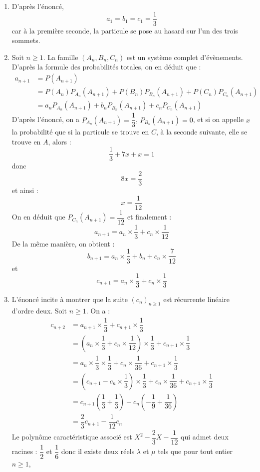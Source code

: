 \documentclass[a4paper,10pt]{report}
\begin{document}
\corr 

\begin{enumerate}
\item D'après l'énoncé,
$$ a_1= b_1=c_1 = \dfrac{1}{3}$$
car à la première seconde, la particule se pose au hasard sur l'un des trois sommets.
\item Soit $n \geq 1$. La famille $(A_n,B_n,C_n)$ est un système complet d'évènements. D'après la formule des probabilités totales, on en déduit que :
\begin{align*}
a_{n+1} & = P(A_{n+1}) \\
& = P(A_n) P_{A_n}(A_{n+1}) + P(B_n) P_{B_n}(A_{n+1}) + P(C_n) P_{C_n}(A_{n+1})  \\
& = a_n P_{A_n}(A_{n+1}) + b_n P_{B_n}(A_{n+1}) + c_n P_{C_n}(A_{n+1})  
\end{align*}
D'après l'énoncé, on a $P_{A_n}(A_{n+1})= \dfrac{1}{3}$, $P_{B_n}(A_{n+1}) = 0$, et si on appelle $x$ la probabilité que si la particule se trouve en $C$, à la seconde suivante, elle se trouve en $A$, alors :
$$ \dfrac{1}{3} + 7x + x = 1$$
donc 
$$ 8x = \dfrac{2}{3}$$
et ainsi :
$$ x = \dfrac{1}{12}$$
On en déduit que $P_{C_n}(A_{n+1}) = \dfrac{1}{12}$ et finalement :
$$ a_{n+1} = a_n \times \dfrac{1}{3}  + c_n \times \dfrac{1}{12}$$
De la même manière, on obtient :
$$ b_{n+1} = a_n \times \dfrac{1}{3} + b_n + c_n \times \dfrac{7}{12} $$
et 
$$ c_{n+1} = a_n \times \dfrac{1}{3} + c_n \times \dfrac{1}{3}$$
\item L'énoncé incite à montrer que la suite $(c_n)_{n \geq 1}$ est récurrente linéaire d'ordre deux. Soit $n \geq 1$. On a :
\begin{align*}
c_{n+2} & = a_{n+1} \times \dfrac{1}{3} + c_{n+1} \times \dfrac{1}{3} \\
& = \left(  a_n \times \dfrac{1}{3}  + c_n \times \dfrac{1}{12} \right) \times \dfrac{1}{3} + c_{n+1} \times \dfrac{1}{3} \\
& = a_n \times \dfrac{1}{3} \times \dfrac{1}{3}  + c_n \times \dfrac{1}{36}  + c_{n+1} \times \dfrac{1}{3} \\
& = \left( c_{n+1} - c_n \times \dfrac{1}{3} \right) \times \dfrac{1}{3}  + c_n \times \dfrac{1}{36}  + c_{n+1} \times \dfrac{1}{3} \\ 
& = c_{n+1} \left( \dfrac{1}{3} + \dfrac{1}{3} \right) + c_n \left(-\dfrac{1}{9} + \dfrac{1}{36} \right) \\
& = \dfrac{2}{3} c_{n+1} - \dfrac{1}{12} c_n
\end{align*}
Le polynôme caractéristique associé est $X^2 - \dfrac{2}{3} X - \dfrac{1}{12}$ qui admet deux racines : $\dfrac{1}{2}$ et $\dfrac{1}{6}$ donc il existe deux réels $\lambda$ et $\mu$ tels que pour tout entier $n \geq 1$,

\end{enumerate}
\end{document}
